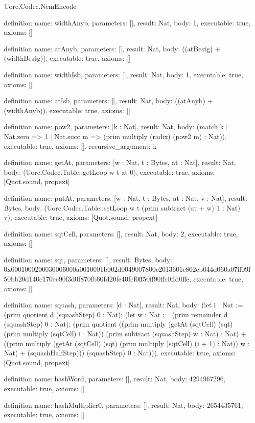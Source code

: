 \begin{lexlean}{Uorc.Codec.NcmEncode}
\begin{semanticmodule}
definition{
  name: widthAnyb,
  parameters: [],
  result: Nat,
  body: 1,
  executable: true,
  axioms: []
}

definition{
  name: atAnyb,
  parameters: [],
  result: Nat,
  body: ((atBestg) + (widthBestg)),
  executable: true,
  axioms: []
}

definition{
  name: widthIsb,
  parameters: [],
  result: Nat,
  body: 1,
  executable: true,
  axioms: []
}

definition{
  name: atIsb,
  parameters: [],
  result: Nat,
  body: ((atAnyb) + (widthAnyb)),
  executable: true,
  axioms: []
}

definition{
  name: pow2,
  parameters: [k : Nat],
  result: Nat,
  body: (match k
    | Nat.zero => 1
    | Nat.succ m => (prim multiply (radix) (pow2 m) : Nat)),
  executable: true,
  axioms: [],
  recursive_argument: k
}

definition{
  name: getAt,
  parameters: [w : Nat, t : Bytes, at : Nat],
  result: Nat,
  body: (Uorc.Codec.Table::getLoop w t at 0),
  executable: true,
  axioms: [Quot.sound, propext]
}

definition{
  name: putAt,
  parameters: [w : Nat, t : Bytes, at : Nat, v : Nat],
  result: Bytes,
  body: (Uorc.Codec.Table::setLoop w t (prim subtract (at + w) 1 : Nat) v),
  executable: true,
  axioms: [Quot.sound, propext]
}

definition{
  name: sqtCell,
  parameters: [],
  result: Nat,
  body: 2,
  executable: true,
  axioms: []
}

definition{
  name: sqt,
  parameters: [],
  result: Bytes,
  body: 0x0001000200030006000a0010001b002d0049007800c2013601e802eb044d060a07ff09f50bb20d140e170ec90f3d0f870fb60fd20fe40fef0ff50ff90ffc0ffd0ffe,
  executable: true,
  axioms: []
}

definition{
  name: squash,
  parameters: [d : Nat],
  result: Nat,
  body: (let i : Nat := (prim quotient d (squashStep) 0 : Nat); (let w : Nat := (prim remainder d (squashStep) 0 : Nat); (prim quotient ((prim multiply (getAt (sqtCell) (sqt) (prim multiply (sqtCell) i : Nat)) (prim subtract (squashStep) w : Nat) : Nat) + ((prim multiply (getAt (sqtCell) (sqt) (prim multiply (sqtCell) (i + 1) : Nat)) w : Nat) + (squashHalfStep))) (squashStep) 0 : Nat))),
  executable: true,
  axioms: [Quot.sound, propext]
}

definition{
  name: hashWord,
  parameters: [],
  result: Nat,
  body: 4294967296,
  executable: true,
  axioms: []
}

definition{
  name: hashMultiplier0,
  parameters: [],
  result: Nat,
  body: 2654435761,
  executable: true,
  axioms: []
}


\end{semanticmodule}
\end{lexlean}

